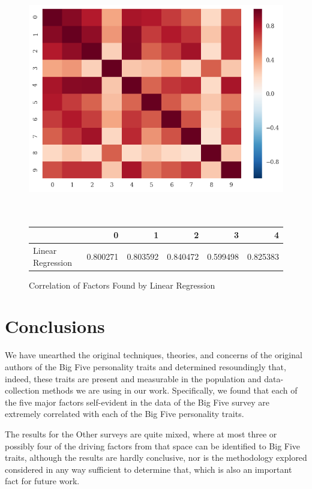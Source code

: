 \documentclass[a4paper,12pt]{article}
\begin{document}
\begin{figure}
\includegraphics[width=\linewidth]{images/linear_reg.png}
\\
\\
\\
\begin{tabular}{lrrrrr}
\toprule
{} &         0 &         1 &         2 &         3 &         4 \\
\midrule
Linear Regression &  0.800271 &  0.803592 &  0.840472 &  0.599498 &  0.825383 \\
\bottomrule
\end{tabular}
\caption{Correlation of Factors Found by Linear Regression}\label{fig:regression}
\end{figure}

\section{Conclusions}

We have unearthed the original techniques, theories, and concerns of the original authors of the Big Five personality traits and determined resoundingly that, indeed, these traits are present and measurable in the population and data-collection methods we are using in our work. Specifically, we found that each of the five major factors self-evident in the data of the Big Five survey are extremely correlated with each of the Big Five personality traits.

The results for the Other surveys are quite mixed, where at most three or possibly four of the driving factors from that space can be identified to Big Five traits, although the results are hardly conclusive, nor is the methodology explored considered in any way sufficient to determine that, which is also an important fact for future work.
\end{document}
